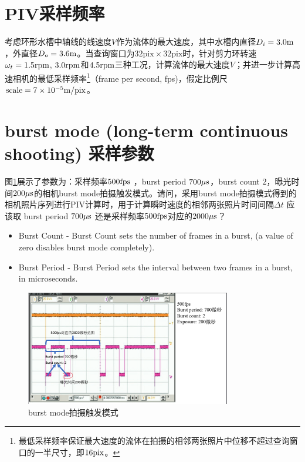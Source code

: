 \documentclass[a4paper]{article}
\begin{document}
\section{PIV采样频率}
考虑环形水槽中轴线的线速度$V$作为流体的最大速度，其中水槽内直径$D_i = 3.0 \rm m $ ，外直径$D_o=3.6\rm m$。当查询窗口为$32 \mathrm{pix} \times 32 \mathrm{pix}$时，针对剪力环转速$\omega_t = 1.5 \rm rpm $, $3.0 \rm rpm $和$4.5 \rm rpm $三种工况，计算流体的最大速度$V$；并进一步计算高速相机的最低采样频率\footnote{最低采样频率保证最大速度的流体在拍摄的相邻两张照片中位移不超过查询窗口的一半尺寸，即$16 \rm pix$。}（frame per second, fps)，假定比例尺$\mathrm{scale} = 7\times 10^{-5} \rm {m}/{pix}$。

\section{burst mode (long-term continuous shooting) 采样参数}
图\ref{fig:Picture1-png}展示了参数为：采样频率$500\rm fps$ ，burst period $700\rm \mu s$，burst count  $2$，曝光时间$200 \rm \mu s$的相机burst mode拍摄触发模式。请问，采用burst mode拍摄模式得到的相机照片序列进行PIV计算时，用于计算瞬时速度的相邻两张照片时间间隔$\Delta t$ 应该取 burst period $700\rm \mu s$ 还是采样频率$500 \rm fps$对应的$2000 \rm \mu s$？

\begin{itemize}
	\item Burst Count - Burst Count sets the number of frames in a burst, (a value of zero disables burst mode completely).
	\item Burst Period - Burst Period sets the interval between two frames in a burst, in microseconds.
\end{itemize}
\begin{figure}[htpb]
	\centering
	\includegraphics[width=0.8\textwidth]{Picture1.png}
	\caption{burst mode拍摄触发模式}
	\label{fig:Picture1-png}
\end{figure}
\end{document}
